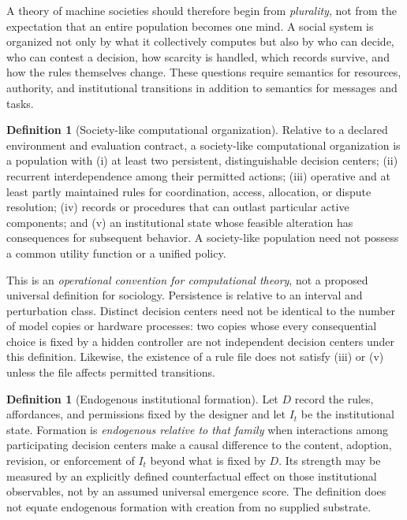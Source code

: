\documentclass[11pt,letterpaper]{article}
\theoremstyle{plain}
\theoremstyle{definition}
\newtheorem{definition}[proposition]{Definition}
\theoremstyle{remark}
\begin{document}
A theory of machine societies should therefore begin from \emph{plurality}, not from the expectation that an entire population becomes one mind. A social system is organized not only by what it collectively computes but also by who can decide, who can contest a decision, how scarcity is handled, which records survive, and how the rules themselves change. These questions require semantics for resources, authority, and institutional transitions in addition to semantics for messages and tasks.

\begin{definition}[Society-like computational organization]\label{def:society}
Relative to a declared environment and evaluation contract, a society-like computational organization is a population with (i) at least two persistent, distinguishable decision centers; (ii) recurrent interdependence among their permitted actions; (iii) operative and at least partly maintained rules for coordination, access, allocation, or dispute resolution; (iv) records or procedures that can outlast particular active components; and (v) an institutional state whose feasible alteration has consequences for subsequent behavior. A society-like population need not possess a common utility function or a unified policy.
\end{definition}

This is an \emph{operational convention for computational theory}, not a proposed universal definition for sociology. Persistence is relative to an interval and perturbation class. Distinct decision centers need not be identical to the number of model copies or hardware processes: two copies whose every consequential choice is fixed by a hidden controller are not independent decision centers under this definition. Likewise, the existence of a rule file does not satisfy (iii) or (v) unless the file affects permitted transitions.

\begin{definition}[Endogenous institutional formation]\label{def:endogenous}
Let $D$ record the rules, affordances, and permissions fixed by the designer and let $I_t$ be the institutional state. Formation is \emph{endogenous relative to that family} when interactions among participating decision centers make a causal difference to the content, adoption, revision, or enforcement of $I_t$ beyond what is fixed by $D$. Its strength may be measured by an explicitly defined counterfactual effect on those institutional observables, not by an assumed universal emergence score. The definition does not equate endogenous formation with creation from no supplied substrate.
\end{definition}
\end{document}
